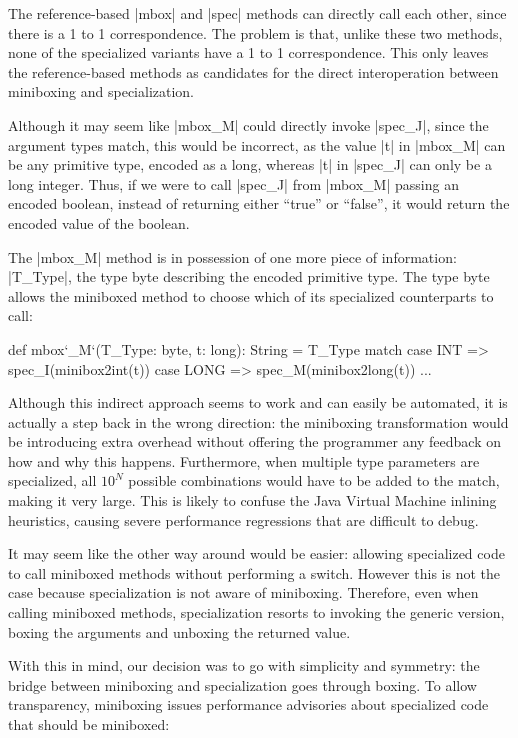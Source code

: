 The reference-based |mbox| and |spec| methods can directly call each other, since there is a 1 to 1 correspondence. The problem is that, unlike these two methods, none of the specialized variants have a 1 to 1 correspondence. This only leaves the reference-based methods as candidates for the direct interoperation between miniboxing and specialization.

Although it may seem like |mbox_M| could directly invoke |spec_J|, since the argument types match, this would be incorrect, as the value |t| in |mbox_M| can be any primitive type, encoded as a long, whereas |t| in |spec_J| can only be a long integer. Thus, if we were to call |spec_J| from |mbox_M| passing an encoded boolean, instead of returning either ``true'' or ``false'', it would return the encoded value of the boolean.

The |mbox_M| method is in possession of one more piece of information: |T_Type|, the type byte describing the encoded primitive type. The type byte allows the miniboxed method to choose which of its specialized counterparts to call:

\begin{lstlisting-nobreak}
 def mbox`_M`(T_Type: byte, t: long): String =
   T_Type match {
     case INT     => spec_I(minibox2int(t))
     case LONG => spec_M(minibox2long(t))
     ...
   }
\end{lstlisting-nobreak}

Although this indirect approach seems to work and can easily be automated, it is actually a  step back in the wrong direction: the miniboxing transformation would be introducing extra overhead without offering the programmer any feedback on how and why this happens. Furthermore, when multiple type parameters are specialized, all $10^N$ possible combinations would have to be added to the match, making it very large. This is likely to confuse the Java Virtual Machine inlining heuristics, causing severe performance regressions that are difficult to debug.

It may seem like the other way around would be easier: allowing specialized code to call miniboxed methods without performing a switch. However this is not the case because specialization is not aware of miniboxing. Therefore, even when calling miniboxed methods, specialization resorts to invoking the generic version, boxing the arguments and unboxing the returned value.

With this in mind, our decision was to go with simplicity and symmetry: the bridge between miniboxing and specialization goes through boxing. To allow transparency, miniboxing issues performance advisories about specialized code that should be miniboxed:

